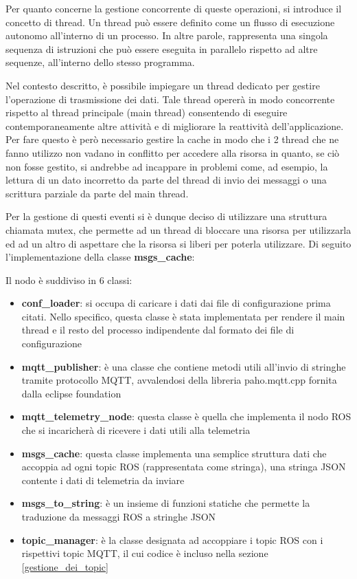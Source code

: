 \noindent Per quanto concerne la gestione concorrente di queste operazioni, si introduce il concetto di thread. Un thread può essere definito come un flusso di esecuzione autonomo all'interno di un processo. In altre parole, rappresenta una singola sequenza di istruzioni che può essere eseguita in parallelo rispetto ad altre sequenze, all'interno dello stesso programma.

\noindent Nel contesto descritto, è possibile impiegare un thread dedicato per gestire l'operazione di trasmissione dei dati. Tale thread opererà in modo concorrente rispetto al thread principale (main thread) consentendo di eseguire contemporaneamente altre attività e di migliorare la reattività dell'applicazione. Per fare questo è però necessario gestire la cache in modo che i 2 thread che ne fanno utilizzo non vadano in conflitto per accedere alla risorsa in quanto, se ciò non fosse gestito, si andrebbe ad incappare in problemi come, ad esempio, la lettura di un dato incorretto da parte del thread di invio dei messaggi o una scrittura parziale da parte del main thread.

\noindent Per la gestione di questi eventi si è dunque deciso di utilizzare una struttura chiamata mutex, che permette ad un thread di bloccare una risorsa per utilizzarla ed ad un altro di aspettare che la risorsa si liberi per poterla utilizzare. Di seguito l'implementazione della classe \textbf{msgs\_cache}:



\noindent Il nodo è suddiviso in 6 classi:

\begin{itemize}
  \item \textbf{conf\_loader}: si occupa di caricare i dati dai file di configurazione prima citati. Nello specifico, questa classe è stata implementata per rendere il main thread e il resto del processo indipendente dal formato dei file di configurazione
  \item \textbf{mqtt\_publisher}: è una classe che contiene metodi utili all'invio di stringhe tramite protocollo MQTT, avvalendosi della libreria paho.mqtt.cpp fornita dalla eclipse foundation 
  \item \textbf{mqtt\_telemetry\_node}: questa classe è quella che implementa il nodo ROS che si incaricherà di ricevere i dati utili alla telemetria
  \item \textbf{msgs\_cache}: questa classe implementa una semplice struttura dati che accoppia ad ogni topic ROS (rappresentata come stringa), una stringa JSON contente i dati di telemetria da inviare
  \item \textbf{msgs\_to\_string}: è un insieme di funzioni statiche che permette la traduzione da messaggi ROS a stringhe JSON
  \item \textbf{topic\_manager}: è la classe designata ad accoppiare i topic ROS con i rispettivi topic MQTT, il cui codice è incluso nella sezione \ref{gestione_dei_topic} 
\end{itemize}


